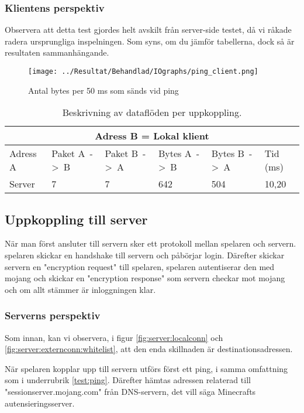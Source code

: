 \documentclass[journal,comsoc]{IEEEtran}
\begin{document}
\subsubsection{Klientens perspektiv}
Observera att detta test gjordes helt avskilt från server-side testet, då vi råkade radera ursprungliga inspelningen. Som syns, om du jämför tabellerna, dock så är resultaten sammanhängande.
\begin{figure} [H]
  \centering
  \texttt{[image: ../Resultat/Behandlad/IOgraphs/ping\_client.png]}
  \caption{Antal bytes per 50 ms som sänds vid ping}
  \label{fig:client:ping}
\end{figure}
\begin{table} [H]
  \begin{center}
    \label{table:client:ping}
    \begin{tabular}{ | m{1.5cm} |  m{1cm} | m{1cm}| m{1cm}|m{1cm}|m{0.5cm}| } 
      \hline
      \multicolumn{6}{|c|}{Adress B = Lokal klient} \\
      \hline
      Adress A & Paket A~->~B & Paket B~->~A & Bytes A~->~B & Bytes B~->~A & Tid (ms) \\
      \hline
      Server & 7 & 7 & 642 & 504 & 10,20 \\
      \hline   
    \end{tabular}
  \end{center}
  \caption{Beskrivning av dataflöden per uppkoppling.}
\end{table}
\subsection{Uppkoppling till server}
När man först ansluter till servern sker ett protokoll mellan spelaren och servern. spelaren skickar en handshake till servern och påbörjar login. Därefter skickar servern en "encryption request" till spelaren, spelaren autentiserar den med mojang och skickar en "encryption response" som servern checkar mot mojang och om allt stämmer är inloggningen klar. \cite{wikivg:protocolencryption}
\subsubsection{Serverns perspektiv}
Som innan, kan vi observera, i figur \ref{fig:server:localconn} och \ref{fig:server:externconn:whitelist}, att den enda skillnaden är destinationsadressen. 

När spelaren kopplar upp till servern utförs först ett ping, i samma omfattning som i underrubrik \ref{test:ping}. Därefter hämtas adressen relaterad till "sessionserver.mojang.com" från DNS-servern, det vill säga Minecrafts autensieringsserver. 
\end{document}
